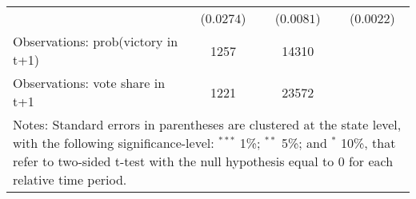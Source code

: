 \begin{table}[htbp]
{\begin{tabular}{lccc}
& ($ 0.0274$) & ($ 0.0081 $)  & ($ 0.0022 $)\\
\addlinespace
Observations: prob(victory in t+1)      &            1257        &     14310  \\
Observations: vote share in t+1      &            1221        &     23572  \\
\hline \hline
\multicolumn{4}{p{1\textwidth}}{\footnotesize{Notes: Standard errors in parentheses are clustered at the state level, with the following significance-level: $^{***}$ 1\%; $^{**}$ 5\%; and $^*$ 10\%, that refer to two-sided t-test with the null hypothesis equal to 0 for each relative time period.}}
\end{tabular}
}
\end{table}
